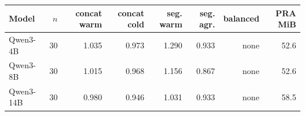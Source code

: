 \begin{tabular}{lrrrrrrr}
\toprule
Model & $n$ & concat warm & concat cold & seg. warm & seg. agr. & balanced & PRA MiB \\
\midrule
Qwen3-4B & 30 & 1.035 & 0.973 & 1.290 & 0.933 & none & 52.6 \\
Qwen3-8B & 30 & 1.015 & 0.968 & 1.156 & 0.867 & none & 52.6 \\
Qwen3-14B & 30 & 0.980 & 0.946 & 1.031 & 0.933 & none & 58.5 \\
\bottomrule
\end{tabular}
